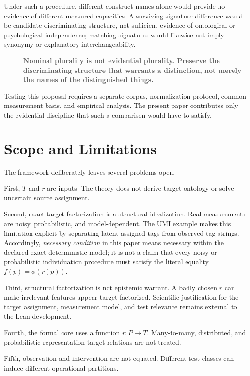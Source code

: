 \documentclass[11pt]{article}
\begin{document}
Under such a procedure, different construct names alone would provide no evidence of different measured capacities. A surviving signature difference would be candidate discriminating structure, not sufficient evidence of ontological or psychological independence; matching signatures would likewise not imply synonymy or explanatory interchangeability.

\begin{quote}
\textbf{Nominal plurality is not evidential plurality. Preserve the discriminating structure that warrants a distinction, not merely the names of the distinguished things.}
\end{quote}

Testing this proposal requires a separate corpus, normalization protocol, common measurement basis, and empirical analysis. The present paper contributes only the evidential discipline that such a comparison would have to satisfy.

\section{Scope and Limitations}

The framework deliberately leaves several problems open.

First, \(T\) and \(r\) are inputs. The theory does not derive target ontology or solve uncertain source assignment.

Second, exact target factorization is a structural idealization. Real measurements are noisy, probabilistic, and model-dependent. The UMI example makes this limitation explicit by separating latent assigned tags from observed tag strings. Accordingly, \emph{necessary condition} in this paper means necessary within the declared exact deterministic model; it is not a claim that every noisy or probabilistic individuation procedure must satisfy the literal equality \(f(p)=\phi(r(p))\).

Third, structural factorization is not epistemic warrant. A badly chosen \(r\) can make irrelevant features appear target-factorized. Scientific justification for the target assignment, measurement model, and test relevance remains external to the Lean development.

Fourth, the formal core uses a function \(r:P\to T\). Many-to-many, distributed, and probabilistic representation-target relations are not treated.

Fifth, observation and intervention are not equated. Different test classes can induce different operational partitions.
\end{document}
